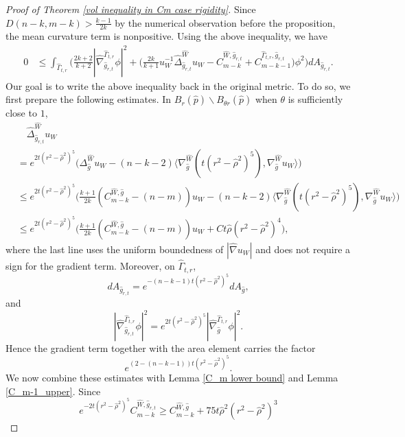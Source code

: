 \documentclass[11pt]{amsart}
\theoremstyle{definition}
\theoremstyle{remark}
\numberwithin{equation}{section}
\begin{document}
\begin{proof}[Proof of Theorem \ref{vol inequality in Cm case rigidity}]
Since $D(n-k,m-k)>\frac{k-1}{2k}$ by the numerical observation before the proposition, the mean
  curvature term is nonpositive. Using the above inequality, we have
\begin{equation}
    \begin{split}
    0&\leq  \int_{\hat{\Gamma}_{t,r}}\bigg(
      \frac{2k+2}{k+2}|\hat\nabla^{\hat{\Gamma}_{t,r}}_{\hat{g}_{r,t}}\phi|^2+\big(\frac{2k}{k+1}u_{W}^{-1}\hat{\Delta}^{\hat{W}}_{\hat{g}_{r,t}} u_{W}-C_{m-k}^{\hat{W},\hat{g}_{r,t}}+C_{m-k-1}^{\hat{\Gamma}_{t,r},\hat{g}_{r,t}}\big)\phi^2 \bigg) dA_{\hat{g}_{r,t}}.
    \end{split}
    \end{equation}
    Our goal is to write the above inequality back in the original metric.
    To do so, we first prepare the following estimates. In
      $B_{r}(\hat{p})\backslash B_{\theta r}(\hat{p})$ when $\theta$ is sufficiently close to $1$,
    \[
    \begin{aligned}
    &\quad\hat{\Delta}^{\hat{W}}_{\hat{g}_{r,t}} u_{W}\\
    &=
      e^{2t(r^2-\hat{\rho}^2)^5}\big(\Delta_{\hat{g}}^{\hat{W}}u_{W}-(n-k-2)\langle\nabla^{\hat{W}}_{\hat{g}}(t(r^2-\hat{\rho}^2)^5),\nabla_{\hat{g}}^{\hat{W}}u_{W}\rangle\big)\\
    &\leq
      e^{2t(r^2-\hat{\rho}^2)^5}\big(\frac{k+1}{2k}(C^{\hat{W},\hat{g}}_{m-k}-(n-m))u_{W}-(n-k-2)\langle\nabla^{\hat{W}}_{\hat{g}}(t(r^2-\hat{\rho}^2)^5),\nabla_{\hat{g}}^{\hat{W}}u_{W}\rangle\big)\\
    &\leq
      e^{2t(r^2-\hat{\rho}^2)^5}\big(\frac{k+1}{2k}(C^{\hat{W},\hat{g}}_{m-k}-(n-m))u_{W}
        +Ct\hat\rho(r^2-\hat\rho^2)^{4}\big),
    \end{aligned}
    \]
    where the last line uses the uniform boundedness of $|\hat\nabla u_W|$ and does not require a
      sign for the gradient term. Moreover, on $\hat{\Gamma}_{t,r}$,
    \[
        dA_{\hat g_{r,t}}
        =e^{-(n-k-1)t(r^2-\hat\rho^2)^5}dA_{\hat g},
    \]
    and
    \[
    |\hat\nabla^{\hat{\Gamma}_{t,r}}_{\hat{g}_{r,t}}\phi|^2=
      e^{2t(r^2-\hat{\rho}^2)^5}|\hat\nabla^{\hat{\Gamma}_{t,r}}_{\hat{g}}\phi|^2.
    \]
    Hence the gradient term together with the area element carries the factor
    \[
        e^{(2-(n-k-1))t(r^2-\hat\rho^2)^5}.
    \]
    We now combine these estimates with Lemma \ref{C_m lower bound} and Lemma
      \ref{C_m-1_upper}. Since
    \[
        e^{-2t(r^2-\hat{\rho}^2)^5}C_{m-k}^{\hat{W},\hat g_{r,t}}
        \geq C_{m-k}^{\hat{W},\hat g}+75t\hat\rho^2(r^2-\hat\rho^2)^3
\]
\end{proof}
\end{document}
